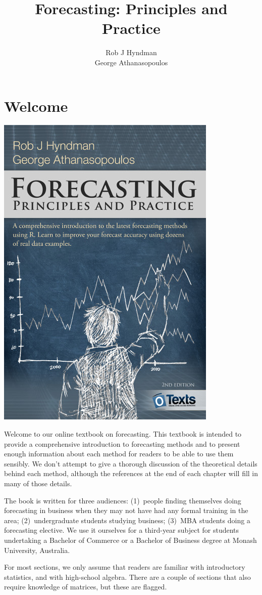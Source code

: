 \documentclass[]{book}
\title{Forecasting: Principles and Practice}
\author{Rob J Hyndman \\ George Athanasopoulos}
\date{}
\begin{document}
\maketitle

{
\setcounter{tocdepth}{1}
\tableofcontents
}
\hypertarget{welcome}{%
\chapter*{Welcome}\label{welcome}}

\begin{center}\includegraphics[width=0.5\linewidth]{fpp2_cover} \end{center}

Welcome to our online textbook on forecasting. This textbook is intended to provide a comprehensive introduction to forecasting methods and to present enough information about each method for readers to be able to use them sensibly. We don't attempt to give a thorough discussion of the theoretical details behind each method, although the references at the end of each chapter will fill in many of those details.

The book is written for three audiences: (1)~people finding themselves doing forecasting in business when they may not have had any formal training in the area; (2)~undergraduate students studying business; (3)~MBA students doing a forecasting elective. We use it ourselves for a third-year subject for students undertaking a Bachelor of Commerce or a Bachelor of Business degree at Monash University, Australia.

For most sections, we only assume that readers are familiar with introductory statistics, and with high-school algebra. There are a couple of sections that also require knowledge of matrices, but these are flagged.
\end{document}
